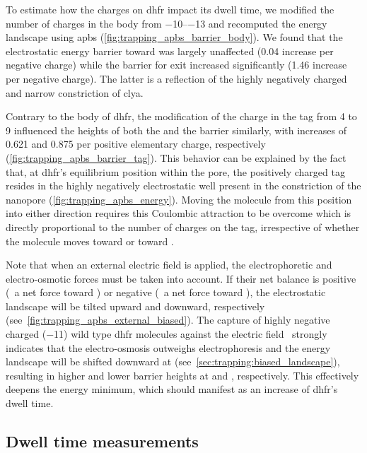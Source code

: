 To estimate how the charges on \gls{dhfr} impact its dwell time, we modified the number of charges in the body
from \SIrange{-10}{-13}{\ec} and recomputed the energy landscape using \gls{apbs}
(\cref{fig:trapping_apbs_barrier_body}). We found that the electrostatic energy barrier toward \cisi{} was
largely unaffected (\SI{0.04}{\kT} increase per negative charge) while the barrier for \transi{} exit
increased significantly (\SI{1.46}{\kT} increase per negative charge). The latter is a reflection of the
highly negatively charged and narrow \transi{} constriction of \gls{clya}.

Contrary to the body of \gls{dhfr}, the modification of the charge in the tag from \num{+4} to \SI{+9}{\ec}
influenced the heights of both the \cisi{} and the \transi{} barrier similarly, with increases of
\SI{0.621}{\kT} and \SI{0.875}{\kT} per positive elementary charge, respectively
(\cref{fig:trapping_apbs_barrier_tag}). This behavior can be explained by the fact that, at \gls{dhfr}'s
equilibrium position within the pore, the positively charged tag resides in the highly negatively
electrostatic well present in the \transi{} constriction of the nanopore (\cref{fig:trapping_apbs_energy}).
Moving the molecule from this position into either direction requires this Coulombic attraction to be overcome
which is directly proportional to the number of charges on the tag, irrespective of whether the molecule moves
toward \cisi{} or toward \transi{}.

Note that when an external electric field is applied, the electrophoretic and electro-osmotic forces must be
taken into account. If their net balance is positive (\ie~a net force toward \cisi{}) or negative (\ie~a net
force toward \transi{}), the electrostatic landscape will be tilted upward and downward, respectively
(see~\cref{fig:trapping_apbs_external_biased}). The capture of highly negative charged (\SI{-11}{\ec}) wild
type \gls{dhfr} molecules against the electric field~\cite{Soskine-Biesemans-2015} strongly indicates that the
electro-osmosis outweighs electrophoresis and the energy landscape will be shifted downward at \transi{}
(see~\cref{sec:trapping:biased_landscape}), resulting in higher and lower barrier heights at \cisi{} and
\transi{}, respectively. This effectively deepens the energy minimum, which should manifest as an increase of
\gls{dhfr}'s dwell time.

\subsection{Dwell time measurements}
%

